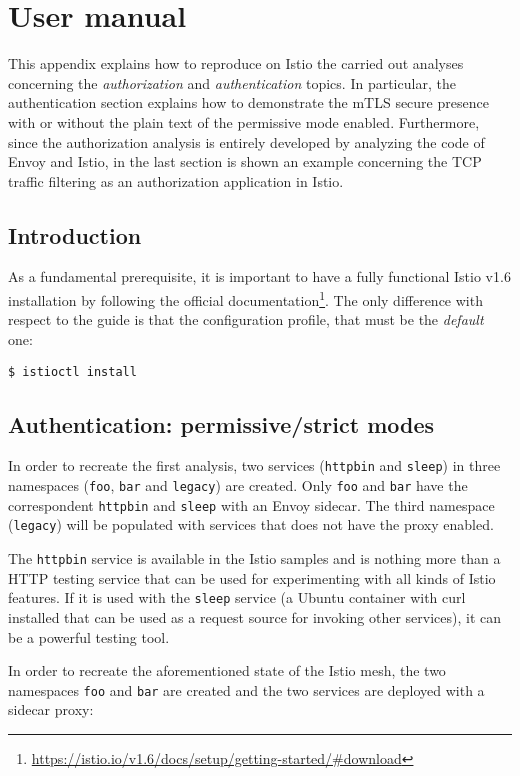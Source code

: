 \appendix
\chapter{User manual}
This appendix explains how to reproduce on Istio the carried out analyses concerning the \textit{authorization} and \textit{authentication} topics. In particular, the authentication section explains how to demonstrate the mTLS secure presence with or without the plain text of the permissive mode enabled. Furthermore, since the authorization analysis is entirely developed by analyzing the code of Envoy and Istio, in the last section is shown an example concerning the TCP traffic filtering as an authorization application in Istio.
\minitoc

\section{Introduction}
As a fundamental prerequisite, it is important to have a fully functional Istio v1.6 installation by following the official documentation\footnote{\url{https://istio.io/v1.6/docs/setup/getting-started/\#download}}. The only difference with respect to the guide is that the configuration profile, that must be the \textit{default} one:

\begin{lstlisting}
$ istioctl install
\end{lstlisting}


\section{Authentication: permissive/strict modes}
In order to recreate the first analysis, two services (\texttt{httpbin} and \texttt{sleep}) in three namespaces (\texttt{foo}, \texttt{bar} and \texttt{legacy}) are created. Only \texttt{foo} and \texttt{bar} have the correspondent \texttt{httpbin} and \texttt{sleep} with an Envoy sidecar. The third namespace (\texttt{legacy}) will be populated with services that does not have the proxy enabled.

The \texttt{httpbin} service is available in the Istio samples and is nothing more than a HTTP testing service that can be used for experimenting with all kinds of Istio features. If it is used with the \texttt{sleep} service (a Ubuntu container with curl installed that can be used as a request source for invoking other services), it can be a powerful testing tool.

In order to recreate the aforementioned state of the Istio mesh, the two namespaces \texttt{foo} and \texttt{bar} are created and the two services are deployed with a sidecar proxy:

